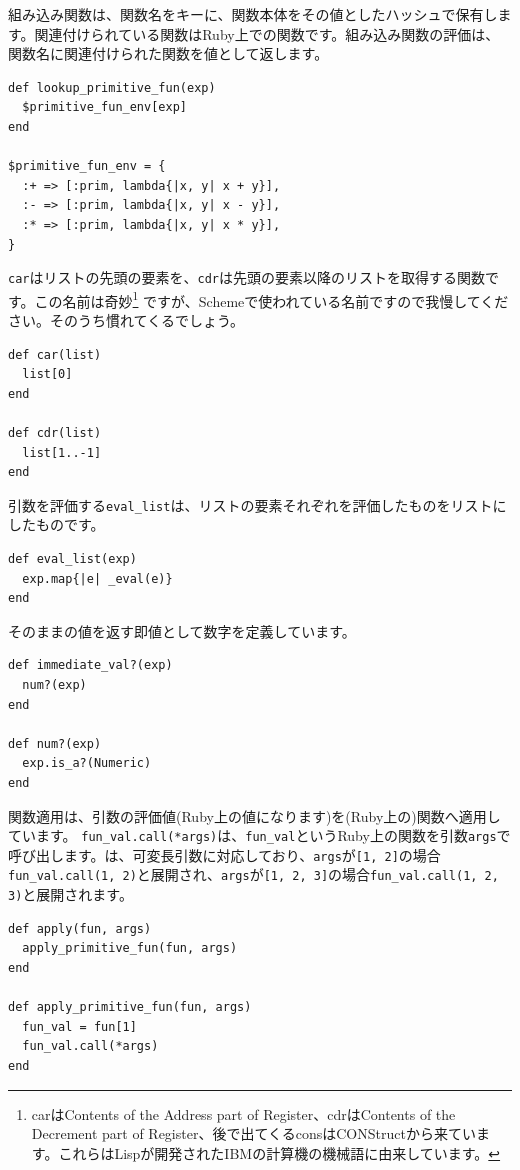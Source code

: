 組み込み関数は、関数名をキーに、関数本体をその値としたハッシュで保有しま
す。関連付けられている関数はRuby上での関数です。組み込み関数の評価は、
関数名に関連付けられた関数を値として返します。

\begin{lstlisting}
def lookup_primitive_fun(exp)
  $primitive_fun_env[exp]
end

$primitive_fun_env = {
  :+ => [:prim, lambda{|x, y| x + y}],
  :- => [:prim, lambda{|x, y| x - y}],
  :* => [:prim, lambda{|x, y| x * y}], 
}
\end{lstlisting}

{\tt car}はリストの先頭の要素を、{\tt cdr}は先頭の要素以降のリストを取得する関数です。この名前は奇妙\footnote{carはContents of the Address part of Register、cdrはContents of the Decrement part of Register、後で出てくるconsはCONStructから来ています。これらはLispが開発されたIBMの計算機の機械語に由来しています。} ですが、Schemeで使われている名前ですので我慢してください。そのうち慣れてくるでしょう。

\begin{lstlisting}
def car(list)
  list[0]
end

def cdr(list)
  list[1..-1]
end
\end{lstlisting}

引数を評価する{\tt eval\_list}は、リストの要素それぞれを評価したものをリストにしたものです。

\begin{lstlisting}
def eval_list(exp)
  exp.map{|e| _eval(e)}
end    
\end{lstlisting}

そのままの値を返す即値として数字を定義しています。

\begin{lstlisting}
def immediate_val?(exp)
  num?(exp) 
end

def num?(exp)
  exp.is_a?(Numeric)
end
\end{lstlisting}

関数適用は、引数の評価値(Ruby上の値になります)を(Ruby上の)関数へ適用しています。
{\tt fun\_val.call(*args)}は、{\tt fun\_val}というRuby上の関数を引数{\tt args}で呼び出します。{\tt *}は、可変長引数に対応しており、{\tt args}が{\tt [1, 2]}の場合{\tt fun\_val.call(1, 2)}と展開され、{\tt args}が{\tt [1, 2, 3]}の場合{\tt fun\_val.call(1, 2, 3)}と展開されます。

\begin{lstlisting}
def apply(fun, args)
  apply_primitive_fun(fun, args)
end

def apply_primitive_fun(fun, args)
  fun_val = fun[1]
  fun_val.call(*args)
end
\end{lstlisting}


